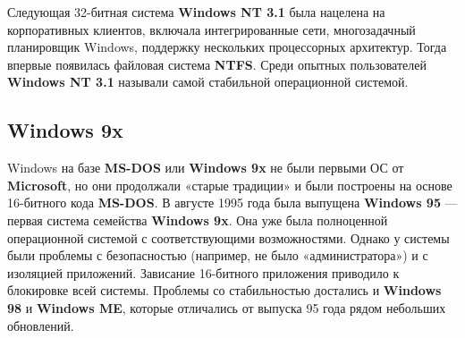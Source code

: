 \documentclass[14pt, a4paper]{article}
\begin{document}
\begin{figure}[h]%
    \centering
    \label{framework} %
\end{figure}

Следующая 32-битная система \textbf{Windows NT 3.1} была нацелена на корпоративных клиентов,
включала интегрированные сети, многозадачный планировщик Windows,
поддержку нескольких процессорных архитектур. Тогда впервые появилась файловая система \textbf{NTFS}.
Среди опытных пользователей \textbf{Windows NT 3.1} называли самой стабильной операционной системой.\newpage

\begin{centering}
    \subsection*{Windows 9x}
\end{centering}

Windows на базе \textbf{MS-DOS} или \textbf{Windows 9x} не были первыми ОС от \textbf{Microsoft},
но они продолжали «старые традиции» и были построены на основе 16-битного кода \textbf{MS-DOS}.
В августе 1995 года была выпущена \textbf{Windows 95} — первая система семейства \textbf{Windows 9x}. Она уже была полноценной
операционной системой с соответствующими возможностями. Однако у системы были проблемы с безопасностью
(например, не было «администратора») и с изоляцией приложений. Зависание 16-битного приложения приводило к блокировке всей системы.
Проблемы со стабильностью достались и \textbf{Windows 98} и \textbf{Windows ME},
которые отличались от выпуска 95 года рядом небольших обновлений. 
\end{document}
